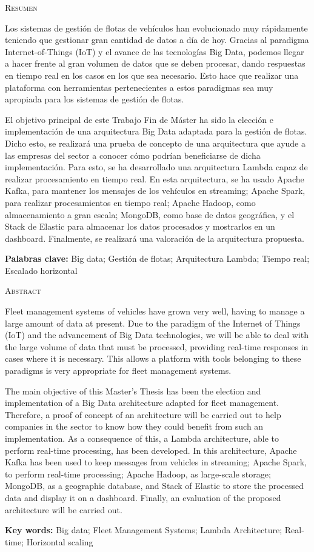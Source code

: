 
\textsc{\LARGE \noindent Resumen}

Los sistemas de gestión de flotas de vehículos han evolucionado muy rápidamente teniendo que gestionar gran cantidad de datos a día de hoy. Gracias al paradigma Internet-of-Things (IoT) y el avance de las tecnologías Big Data, podemos llegar a hacer frente al gran volumen de datos que se deben procesar, dando respuestas en tiempo real en los casos en los que sea necesario. Esto hace que realizar una plataforma con herramientas pertenecientes a estos paradigmas sea muy apropiada para los sistemas de gestión de flotas.

El objetivo principal de este Trabajo Fin de Máster ha sido la elección e implementación de una arquitectura Big Data adaptada para la gestión de flotas. Dicho esto, se realizará una prueba de concepto de una arquitectura que ayude a las empresas del sector a conocer cómo podrían beneficiarse de dicha implementación. Para esto, se ha desarrollado una arquitectura Lambda capaz de realizar procesamiento en tiempo real. En esta arquitectura, se ha usado Apache Kafka, para mantener los mensajes de los vehículos en streaming; Apache Spark, para realizar procesamientos en tiempo real; Apache Hadoop, como almacenamiento a gran escala; MongoDB, como base de datos geográfica, y el Stack de Elastic para almacenar los datos procesados y mostrarlos en un dashboard. Finalmente, se realizará una valoración de la arquitectura propuesta.

\hfill \break
\textbf{Palabras clave:} Big data; Gestión de flotas; Arquitectura Lambda; Tiempo real; Escalado horizontal

\textsc{\LARGE \noindent Abstract}

Fleet management systems of vehicles have grown very well, having to manage a large amount of data at present. Due to the paradigm of the Internet of Things (IoT) and the advancement of Big Data technologies, we will be able to deal with the large volume of data that must be processed, providing real-time responses in cases where it is necessary. This allows a platform with tools belonging to these paradigms is very appropriate for fleet management systems.

The main objective of this Master’s Thesis has been the election and implementation of a Big Data architecture adapted for fleet management. Therefore, a proof of concept of an architecture will be carried out to help companies in the sector to know how they could benefit from such an implementation. As a consequence of this, a Lambda architecture, able to perform  real-time processing, has been developed. In this architecture, Apache Kafka has been used to keep messages from vehicles in streaming; Apache Spark, to perform real-time processing; Apache Hadoop, as large-scale storage; MongoDB, as a geographic database, and Stack of Elastic to store the processed data and display it on a dashboard. Finally, an evaluation of the proposed architecture will be carried out.

\hfill \break
\textbf{Key  words:} Big data; Fleet Management Systems; Lambda Architecture; Real-time; Horizontal scaling

